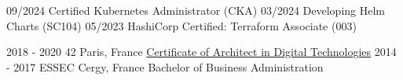 \documentclass[10pt]{developercv} %
\begin{document}


\begin{entrylist}
	\certentry
		{09/2024}
		{Certified Kubernetes Administrator (CKA)}
	\certentry
		{03/2024}
		{Developing Helm Charts (SC104)}
	\certentry
		{05/2023}
		{HashiCorp Certified: Terraform Associate (003)}
\end{entrylist}



\begin{entrylist}
	\entry
		{2018 - 2020}
		{42}
		{Paris, France}
		{\href{https://cv.42.fr/abarthel}{Certificate of Architect in Digital Technologies}}
	\entry
		{2014 - 2017}
		{ESSEC}
		{Cergy, France}
		{Bachelor of Business Administration}
\end{entrylist}

\end{document}
